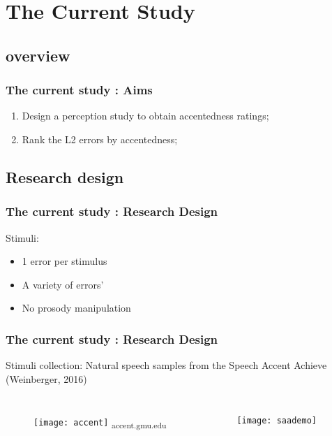 \documentclass{beamer}
\begin{document}
\section{The Current Study}
\subsection{overview}
\begin{frame}
\frametitle{The current study : Aims}
\begin{enumerate}
\item{Design a perception study to obtain accentedness ratings;}\linebreak
\item{Rank the L2 errors by accentedness;}\linebreak
\end{enumerate}
\end{frame}

\subsection{Research design}
\begin{frame}
\frametitle{The current study : Research Design}
Stimuli:
\begin{itemize} 
\item 1 error per stimulus
\item A variety of  errors'
\item No prosody manipulation 
\end{itemize}

\end{frame}
\begin{frame}
\frametitle{The current study : Research Design}
Stimuli collection: \linebreak
Natural speech samples from the Speech Accent Achieve (Weinberger, 2016)
\begin{columns}[c] %
\begin{figure}
\texttt{[image: accent]}
\linebreak \textsubscript{accent.gmu.edu}
\end{figure}
\begin{figure}
\texttt{[image: saademo]}
\end{figure}
\end{columns}
\end{frame}
\end{document}
